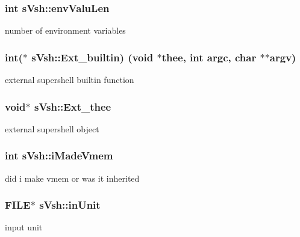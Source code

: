 \subsubsection[{env\+Valu\+Len}]{\setlength{\rightskip}{0pt plus 5cm}int s\+Vsh\+::env\+Valu\+Len}\label{a00007_a6f5d3a3bfe8edef74e14262dca64eb19}


number of environment variables 

\subsubsection[{Ext\+\_\+builtin}]{\setlength{\rightskip}{0pt plus 5cm}int($\ast$ s\+Vsh\+::\+Ext\+\_\+builtin) (void $\ast$thee, int argc, char $\ast$$\ast$argv)}\label{a00007_af6a657bde089d08b55bea2bbb88ad3bc}


external supershell builtin function 

\subsubsection[{Ext\+\_\+thee}]{\setlength{\rightskip}{0pt plus 5cm}void$\ast$ s\+Vsh\+::\+Ext\+\_\+thee}\label{a00007_aca365034a12a00d62f79aea0e74c24c0}


external supershell object 

\subsubsection[{i\+Made\+Vmem}]{\setlength{\rightskip}{0pt plus 5cm}int s\+Vsh\+::i\+Made\+Vmem}\label{a00007_a4d9333d357f6b00cb9d6a9152835385a}


did i make vmem or was it inherited 

\subsubsection[{in\+Unit}]{\setlength{\rightskip}{0pt plus 5cm}F\+I\+L\+E$\ast$ s\+Vsh\+::in\+Unit}\label{a00007_a71b219a119b8ea2d6a8e8310fff87ad5}


input unit 

